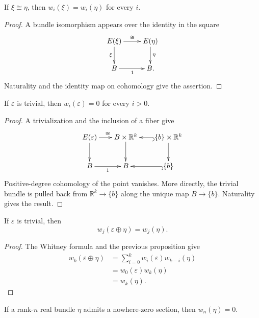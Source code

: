 \begin{proposition}
\label{at-proposition-sw-bundle-isomorphism}
If $\xi\cong\eta$, then
$w_i(\xi)=w_i(\eta)$ for every $i$.
\end{proposition}

\begin{proof}
A bundle isomorphism appears over the
identity
in the square
$$
\xymatrix{
E(\xi)\ar[r]^{\cong}\ar[d]_{\xi}&
E(\eta)\ar[d]^{\eta}\\
B\ar[r]_1&B.
}
$$
Naturality and the identity map on cohomology
give the assertion.
\end{proof}

\begin{proposition}
\label{at-proposition-sw-trivial-bundle}
If $\varepsilon$ is trivial, then
$w_i(\varepsilon)=0$ for every $i>0$.
\end{proposition}

\begin{proof}
A trivialization and the inclusion of a fiber
give
$$
\xymatrix@C=18pt{
E(\varepsilon)\ar[r]^{\cong}\ar[d]&
B\times\mathbb{R}^k\ar[d]&
\{b\}\times\mathbb{R}^k
\ar@{^{(}->}[l]\ar[d]\\
B\ar[r]_1&B&\{b\}\ar@{^{(}->}[l].
}
$$
Positive-degree cohomology of the point
vanishes.  More directly, the trivial bundle
is pulled back from
$\mathbb{R}^k\longrightarrow\{b\}$ along the
unique map $B\longrightarrow\{b\}$.
Naturality gives the result.
\end{proof}

\begin{proposition}
\label{at-proposition-sw-stable}
If $\varepsilon$ is trivial, then
$$
w_j(\varepsilon\oplus\eta)=w_j(\eta).
$$
\end{proposition}

\begin{proof}
The Whitney formula and the previous
proposition give
$$
\begin{aligned}
w_k(\varepsilon\oplus\eta)
&=\sum_{i=0}^k
w_i(\varepsilon)w_{k-i}(\eta)\\
&=w_0(\varepsilon)w_k(\eta)\\
&=w_k(\eta).
\end{aligned}
$$
\end{proof}

\begin{proposition}
\label{at-proposition-section-kills-top-sw}
If a rank-$n$ real bundle $\eta$ admits a
nowhere-zero section, then $w_n(\eta)=0$.
\end{proposition}

